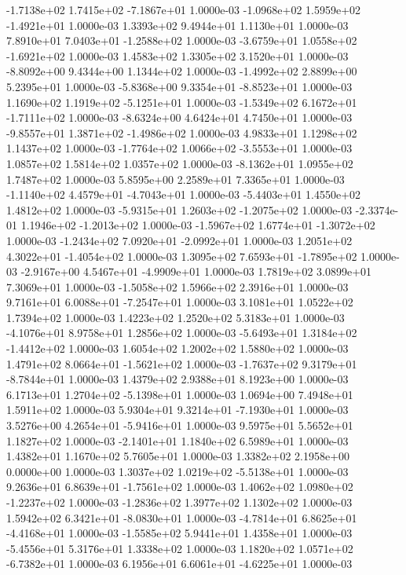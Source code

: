 -1.7138e+02  1.7415e+02 -7.1867e+01  1.0000e-03
-1.0968e+02  1.5959e+02 -1.4921e+01  1.0000e-03
1.3393e+02 9.4944e+01 1.1130e+01  1.0000e-03
 7.8910e+01  7.0403e+01 -1.2588e+02  1.0000e-03
-3.6759e+01  1.0558e+02 -1.6921e+02  1.0000e-03
1.4583e+02 1.3305e+02 3.1520e+01  1.0000e-03
-8.8092e+00  9.4344e+00  1.1344e+02  1.0000e-03
-1.4992e+02  2.8899e+00  5.2395e+01  1.0000e-03
-5.8368e+00  9.3354e+01 -8.8523e+01  1.0000e-03
 1.1690e+02  1.1919e+02 -5.1251e+01  1.0000e-03
-1.5349e+02  6.1672e+01 -1.7111e+02  1.0000e-03
-8.6324e+00  4.6424e+01  4.7450e+01  1.0000e-03
-9.8557e+01  1.3871e+02 -1.4986e+02  1.0000e-03
4.9833e+01 1.1298e+02 1.1437e+02  1.0000e-03
-1.7764e+02  1.0066e+02 -3.5553e+01  1.0000e-03
1.0857e+02 1.5814e+02 1.0357e+02  1.0000e-03
-8.1362e+01  1.0955e+02  1.7487e+02  1.0000e-03
5.8595e+00 2.2589e+01 7.3365e+01  1.0000e-03
-1.1140e+02  4.4579e+01 -4.7043e+01  1.0000e-03
-5.4403e+01  1.4550e+02  1.4812e+02  1.0000e-03
-5.9315e+01  1.2603e+02 -1.2075e+02  1.0000e-03
-2.3374e-01  1.1946e+02 -1.2013e+02  1.0000e-03
-1.5967e+02  1.6774e+01 -1.3072e+02  1.0000e-03
-1.2434e+02  7.0920e+01 -2.0992e+01  1.0000e-03
 1.2051e+02  4.3022e+01 -1.4054e+02  1.0000e-03
 1.3095e+02  7.6593e+01 -1.7895e+02  1.0000e-03
-2.9167e+00  4.5467e+01 -4.9909e+01  1.0000e-03
1.7819e+02 3.0899e+01 7.3069e+01  1.0000e-03
-1.5058e+02  1.5966e+02  2.3916e+01  1.0000e-03
 9.7161e+01  6.0088e+01 -7.2547e+01  1.0000e-03
3.1081e+01 1.0522e+02 1.7394e+02  1.0000e-03
1.4223e+02 1.2520e+02 5.3183e+01  1.0000e-03
-4.1076e+01  8.9758e+01  1.2856e+02  1.0000e-03
-5.6493e+01  1.3184e+02 -1.4412e+02  1.0000e-03
1.6054e+02 1.2002e+02 1.5880e+02  1.0000e-03
 1.4791e+02  8.0664e+01 -1.5621e+02  1.0000e-03
-1.7637e+02  9.3179e+01 -8.7844e+01  1.0000e-03
1.4379e+02 2.9388e+01 8.1923e+00  1.0000e-03
 6.1713e+01  1.2704e+02 -5.1398e+01  1.0000e-03
1.0694e+00 7.4948e+01 1.5911e+02  1.0000e-03
 5.9304e+01  9.3214e+01 -7.1930e+01  1.0000e-03
 3.5276e+00  4.2654e+01 -5.9416e+01  1.0000e-03
9.5975e+01 5.5652e+01 1.1827e+02  1.0000e-03
-2.1401e+01  1.1840e+02  6.5989e+01  1.0000e-03
1.4382e+01 1.1670e+02 5.7605e+01  1.0000e-03
1.3382e+02 2.1958e+00 0.0000e+00  1.0000e-03
 1.3037e+02  1.0219e+02 -5.5138e+01  1.0000e-03
 9.2636e+01  6.8639e+01 -1.7561e+02  1.0000e-03
 1.4062e+02  1.0980e+02 -1.2237e+02  1.0000e-03
-1.2836e+02  1.3977e+02  1.1302e+02  1.0000e-03
 1.5942e+02  6.3421e+01 -8.0830e+01  1.0000e-03
-4.7814e+01  6.8625e+01 -4.4168e+01  1.0000e-03
-1.5585e+02  5.9441e+01  1.4358e+01  1.0000e-03
-5.4556e+01  5.3176e+01  1.3338e+02  1.0000e-03
 1.1820e+02  1.0571e+02 -6.7382e+01  1.0000e-03
 6.1956e+01  6.6061e+01 -4.6225e+01  1.0000e-03
